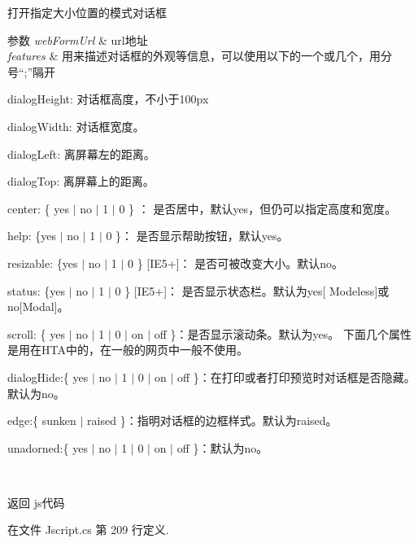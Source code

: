 打开指定大小位置的模式对话框 


\begin{DoxyParams}{参数}
{\em web\+Form\+Url} & url地址\\
\hline
{\em features} & 用来描述对话框的外观等信息，可以使用以下的一个或几个，用分号“;”隔开
\begin{DoxyEnumerate}
\item dialog\+Height\+: 对话框高度，不小于100px
\item dialog\+Width\+: 对话框宽度。
\item dialog\+Left\+: 离屏幕左的距离。
\item dialog\+Top\+: 离屏幕上的距离。
\item center\+: \{ yes $\vert$ no $\vert$ 1 $\vert$ 0 \} ： 是否居中，默认yes，但仍可以指定高度和宽度。
\item help\+: \{yes $\vert$ no $\vert$ 1 $\vert$ 0 \}： 是否显示帮助按钮，默认yes。
\item resizable\+: \{yes $\vert$ no $\vert$ 1 $\vert$ 0 \} \mbox{[}I\+E5+\mbox{]}： 是否可被改变大小。默认no。
\item status\+: \{yes $\vert$ no $\vert$ 1 $\vert$ 0 \} \mbox{[}I\+E5+\mbox{]}： 是否显示状态栏。默认为yes\mbox{[} Modeless\mbox{]}或no\mbox{[}Modal\mbox{]}。
\item scroll\+: \{ yes $\vert$ no $\vert$ 1 $\vert$ 0 $\vert$ on $\vert$ off \}：是否显示滚动条。默认为yes。 下面几个属性是用在\+H\+T\+A中的，在一般的网页中一般不使用。
\item dialog\+Hide\+:\{ yes $\vert$ no $\vert$ 1 $\vert$ 0 $\vert$ on $\vert$ off \}：在打印或者打印预览时对话框是否隐藏。默认为no。
\item edge\+:\{ sunken $\vert$ raised \}：指明对话框的边框样式。默认为raised。
\item unadorned\+:\{ yes $\vert$ no $\vert$ 1 $\vert$ 0 $\vert$ on $\vert$ off \}：默认为no。 
\end{DoxyEnumerate}\\
\hline
\end{DoxyParams}
\begin{DoxyReturn}{返回}
js代码
\end{DoxyReturn}


在文件 Jscript.\+cs 第 209 行定义.

\mbox{\label{class_x_c_l_net_tools_1_1_javascript_1_1_jscript_a2a6b3bcc01894290fbbf4835a328d396}} 
